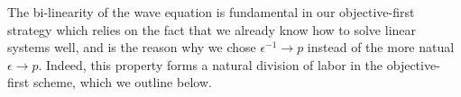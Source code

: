 The bi-linearity of the wave equation
    is fundamental in our objective-first strategy
    which relies on the fact
    that we already know how to solve linear systems well,
    and is the reason why we chose $\epsilon^{-1} \to p$
    instead of the more natual $\epsilon \to p$.
Indeed, this property forms a natural division of labor
    in the objective-first scheme, which we outline below.


